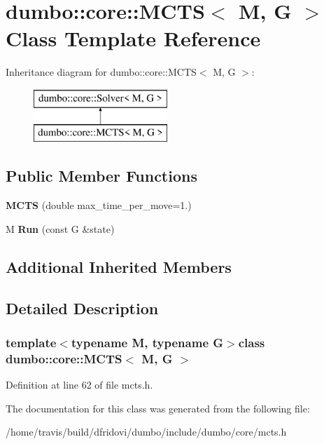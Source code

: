 \hypertarget{classdumbo_1_1core_1_1_m_c_t_s}{\section{dumbo\-:\-:core\-:\-:M\-C\-T\-S$<$ M, G $>$ Class Template Reference}
\label{classdumbo_1_1core_1_1_m_c_t_s}
}
Inheritance diagram for dumbo\-:\-:core\-:\-:M\-C\-T\-S$<$ M, G $>$\-:\begin{figure}[H]
\begin{center}
\leavevmode
\includegraphics[height=2.000000cm]{classdumbo_1_1core_1_1_m_c_t_s}
\end{center}
\end{figure}
\subsection*{Public Member Functions}
\begin{DoxyCompactItemize}
\item 
\hypertarget{classdumbo_1_1core_1_1_m_c_t_s_adc54c1c87ffe8ceb3497847acae9a5b1}{{\bfseries M\-C\-T\-S} (double max\-\_\-time\-\_\-per\-\_\-move=1.)}\label{classdumbo_1_1core_1_1_m_c_t_s_adc54c1c87ffe8ceb3497847acae9a5b1}

\item 
\hypertarget{classdumbo_1_1core_1_1_m_c_t_s_a2d62159e6a1d4c71a89fa81aa0d8dd93}{M {\bfseries Run} (const G \&state)}\label{classdumbo_1_1core_1_1_m_c_t_s_a2d62159e6a1d4c71a89fa81aa0d8dd93}

\end{DoxyCompactItemize}
\subsection*{Additional Inherited Members}


\subsection{Detailed Description}
\subsubsection*{template$<$typename M, typename G$>$class dumbo\-::core\-::\-M\-C\-T\-S$<$ M, G $>$}



Definition at line 62 of file mcts.\-h.



The documentation for this class was generated from the following file\-:\begin{DoxyCompactItemize}
\item 
/home/travis/build/dfridovi/dumbo/include/dumbo/core/mcts.\-h\end{DoxyCompactItemize}
